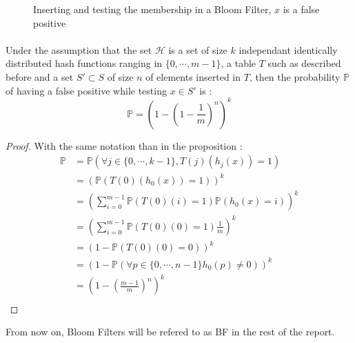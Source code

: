 \begin{figure}[H]
\caption{Inserting and testing the membership in a Bloom Filter, $x$ is a false positive} \label{fig:fp}
\end{figure}
\paragraph{}
\begin{proposition}
 Under the assumption that the set $\mathcal H$ is a set of size $k$ independant identically distributed hash functions ranging in $\{0,\cdots,m-1\}$, a table $T$ such as described before and a set $S'\subset S$  of size $n$ of elements inserted in $T$, then the probability $\mathbb{P}$ of having a false positive while testing $x \in S'$ is :
 \[
  \mathbb{P}=\left ( 1 - \left ( 1 - \frac{1}{m} \right )^n \right )^k
 \]
\end{proposition}
\begin{proof}
With the same notation than in the proposition :
 \begin{align*}
  \mathbb{P} &= \mathbb{P}(\forall j \in \{0,\cdots,k-1\}, T(j)(h_j(x)) = 1)\\
    &= \left ( \mathbb{P}(T(0)(h_0(x)) = 1) \right )^k\\
    &= \left ( \sum_{i=0}^{m-1} \mathbb{P}(T(0)(i) = 1)\mathbb{P}(h_0(x) = i)\right )^k\\
    &= \left ( \sum_{i=0}^{m-1} \mathbb{P}(T(0)(0) = 1)\frac{1}{m}\right )^k\\
    &= \left ( 1- \mathbb{P}(T(0)(0) = 0)\right )^k\\
    &= \left ( 1- \mathbb{P}(\forall p \in \{0,\cdots,n-1\} h_0(p) \neq 0 )\right )^k\\
    &= \left ( 1- \left ( \frac{m-1}{m} \right )^n \right )^k\\
 \end{align*}
\end{proof}
From now on, Bloom Filters will be refered to as BF in the rest of the report.
